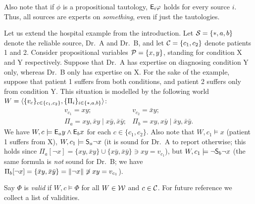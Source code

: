 Also note that if $\phi$ is a propositional tautology, $\E_i\phi$ holds for
every source $i$. Thus, all sources are experts on \emph{something}, even if
just the tautologies.

\begin{example}
    \label{kr_ex_hospital_world}
    Let us extend the hospital example from the introduction. Let $\srcs = \{\ast,
    a, b\}$ denote the reliable source, Dr.\ A and Dr.\ B, and let $\C = \{c_1,
    c_2\}$ denote patients 1 and 2. Consider propositional variables
    $\propvars = \{x, y\}$, standing
    for condition X and Y respectively. Suppose that Dr.\ A has expertise on
    diagnosing condition Y only, whereas Dr.\ B only has expertise on X. For the
    sake of the example, suppose that patient 1 suffers from both conditions,
    and patient 2 suffers only from condition Y. This situation is modelled by
    the following world $W = \tuple{\{v_c\}_{c \in \{c_1, c_2\}}, \{\Pi_i\}_{i
    \in \{\ast, a, b\}}}$:
    \[
        \begin{array}{cc}
            v_{c_1} = xy;
            &
            v_{c_2} = \bar{x}y;
            \\
            \Pi_a = xy, \bar{x}y \mid x\bar{y}, \bar{x}\bar{y};
            &
            \Pi_b = xy, x\bar{y} \mid \bar{x}y, \bar{x}\bar{y}.
        \end{array}
    \]
    We have $W, c \models \E_a y
    \land \E_b x$ for each $c \in \{c_1, c_2\}$. Also note that $W, c_1 \models
    x$ (patient 1 suffers from X), $W, c_1 \models \S_a{\neg x}$ (it is sound
    for Dr.\ A to report otherwise; this holds since $\Pi_a[\neg x] = \{xy,
    \bar{x}y\} \cup \{x\bar{y}, \bar{x}\bar{y}\} \ni xy = v_{c_1}$), but $W,
    c_1 \models \neg \S_b{\neg x}$ (the same formula is \emph{not} sound for
    Dr.\
    B; we have $\Pi_b[\neg x] = \{\bar{x}y, \bar{x}\bar{y}\} = \propmods{\neg
    x} \not\ni xy = v_{c_1}$).
\end{example}

Say $\Phi$ is \emph{valid} if $W, c \models \Phi$ for all $W \in \W$ and $c \in \C$.
For future reference we collect a list of validities.


